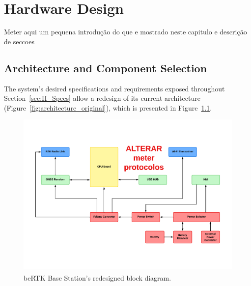 

\chapter{Hardware Design}\label{cha:chapter3_HardwareDesign}

Meter aqui um pequena introdução do que e mostrado neste capitulo e descrição de seccoes

\section{Architecture and Component Selection}\label{31_Architecture}

The system's desired specifications and requirements exposed throughout Section~\ref{sec:II_Specs} allow a redesign of its current architecture (Figure~\ref{fig:architecture_original}), which is presented in Figure~\ref{fig:architecture_new}.

\begin{figure}[h]
	\centering
	\includegraphics[width=1.0\textwidth]{Chapters/Figures/new_architecture.pdf}
	\caption{beRTK\textsuperscript{\textregistered} Base Station's redesigned block diagram.}
	\label{fig:architecture_new}
\end{figure}

